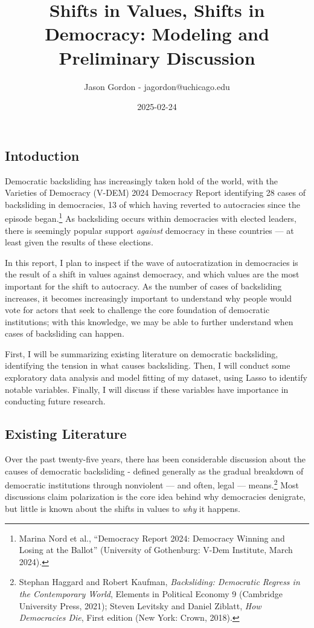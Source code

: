 \documentclass[
  letterpaper,
  DIV=11,
  numbers=noendperiod]{scrartcl}
\title{Shifts in Values, Shifts in Democracy: Modeling and Preliminary
Discussion}
\author{Jason Gordon - jagordon@uchicago.edu}
\date{2025-02-24}
\begin{document}
\maketitle


\newpage
\tableofcontents
\newpage

\subsection{Intoduction}\label{intoduction}

Democratic backsliding has increasingly taken hold of the world, with
the Varieties of Democracy (V-DEM) 2024 Democracy Report identifying 28
cases of backsliding in democracies, 13 of which having reverted to
autocracies since the episode began.\footnote{Marina Nord et al.,
  {``Democracy {Report} 2024: {Democracy Winning} and {Losing} at the
  {Ballot}''} (University of Gothenburg: V-Dem Institute, March 2024).}
As backsliding occurs within democracies with elected leaders, there is
seemingly popular support \emph{against} democracy in these countries
--- at least given the results of these elections.

In this report, I plan to inspect if the wave of autocratization in
democracies is the result of a shift in values against democracy, and
which values are the most important for the shift to autocracy. As the
number of cases of backsliding increases, it becomes increasingly
important to understand why people would vote for actors that seek to
challenge the core foundation of democratic institutions; with this
knowledge, we may be able to further understand when cases of
backsliding can happen.

First, I will be summarizing existing literature on democratic
backsliding, identifying the tension in what causes backsliding. Then, I
will conduct some exploratory data analysis and model fitting of my
dataset, using Lasso to identify notable variables. Finally, I will
discuss if these variables have importance in conducting future
research.

\subsection{Existing Literature}\label{existing-literature}

Over the past twenty-five years, there has been considerable discussion
about the causes of democratic backsliding - defined generally as the
gradual breakdown of democratic institutions through nonviolent --- and
often, legal --- means.\footnote{Stephan Haggard and Robert Kaufman,
  \emph{Backsliding: {Democratic Regress} in the {Contemporary World}},
  Elements in {Political Economy} 9 (Cambridge University Press, 2021);
  Steven Levitsky and Daniel Ziblatt, \emph{How {Democracies Die}},
  First edition (New York: Crown, 2018).} Most discussions claim
polarization is the core idea behind why democracies denigrate, but
little is known about the shifts in values to \emph{why} it happens.
\end{document}
